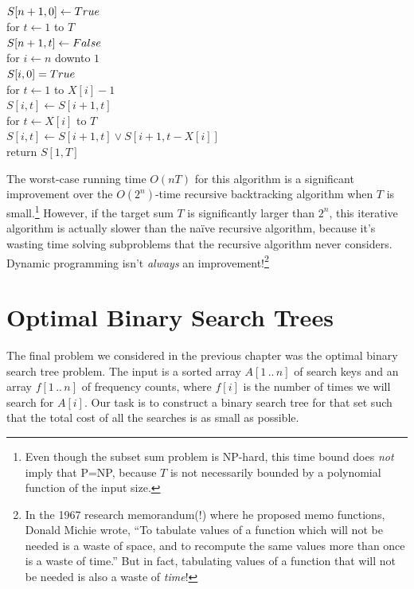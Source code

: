 \begin{pseudocode}
\\
$S[n+1, 0] \gets True$\\
for $t \gets 1$ to $T$\\
\Indent $S[n+1, t] \gets False$\\
for $i \gets n$ downto $1$\\
\Indent $S[i, 0] = True$\\
\Indent for $t \gets 1$ to $X[i] - 1$\\
\Indent\Indent $S[i, t] \gets S[i+1, t]$ \\
\Indent for $t \gets X[i]$ to $T$\\
\Indent\Indent $S[i, t] \gets S[i+1, t] \vee S[i+1, t - X[i]]$\\
return $S[1, T]$
\end{pseudocode}

The worst-case running time $O(nT)$ for this algorithm is a significant improvement over the $O(2^n)$-time recursive backtracking algorithm when $T$ is small.\footnote{Even though the subset sum problem is NP-hard, this time bound does \textit{not} imply that P=NP, because $T$ is not necessarily bounded by a polynomial function of the input size.}
However, if the target sum $T$ is significantly larger than $2^n$, this iterative algorithm is actually slower than the naïve recursive algorithm, because it’s wasting time solving subproblems that the recursive algorithm never considers.
Dynamic programming isn’t \textit{always} an improvement!\footnote{In the 1967 research memorandum(!) where he proposed memo functions, Donald Michie wrote, “To tabulate values of a function which will not be needed is a waste of space, and to recompute the same values more than once is a waste of time.” But in fact, tabulating values of a function that will not be needed is also a waste of \textit{time}!}

\section{Optimal Binary Search Trees}
\label{sec:3.9}

The final problem we considered in the previous chapter was the optimal binary search tree problem.
The input is a sorted array $A[1\,..\,n]$ of search keys and an array $f[1\,..\,n]$ of frequency counts, where $f[i]$ is the number of times we will search for $A[i]$.
Our task is to construct a binary search tree for that set such that the total cost of all the searches is as small as possible.

